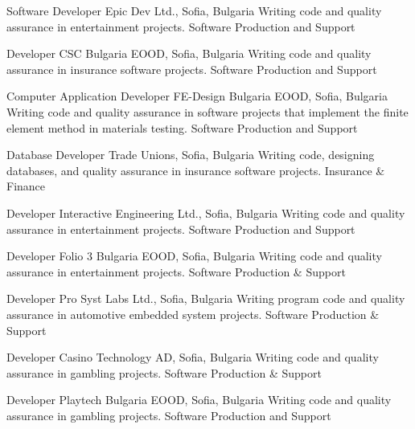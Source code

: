 \documentclass[english,a4paper]{europasscv}
\begin{document}
\begin{europasscv}
   {Software Developer}
  \ecvitem {} {Epic Dev Ltd., Sofia, Bulgaria}
  \ecvitem {} {Writing code and quality assurance in entertainment projects.}
  \ecvitem {} { \quad Software Production and Support}
  
   {Developer}
  \ecvitem {} {CSC Bulgaria EOOD, Sofia, Bulgaria}
  \ecvitem {} {Writing code and quality assurance in insurance software projects.}
  \ecvitem {} { \quad Software Production and Support}
  
   {Computer Application Developer}
  \ecvitem {} {FE-Design Bulgaria EOOD, Sofia, Bulgaria}
  \ecvitem {} {Writing code and quality assurance in software projects that implement the finite element method in materials testing.}
  \ecvitem {} { \quad Software Production and Support}
  
   {Database Developer}
  \ecvitem {} {Trade Unions, Sofia, Bulgaria}
  \ecvitem {} {Writing code, designing databases, and quality assurance in insurance software projects.}
  \ecvitem {} { \quad Insurance \& Finance}
  
   {Developer}
  \ecvitem {} {Interactive Engineering Ltd., Sofia, Bulgaria}
  \ecvitem {} {Writing code and quality assurance in entertainment projects.}
  \ecvitem {} { \quad Software Production and Support}
  
   {Developer}
  \ecvitem {} {Folio 3 Bulgaria EOOD, Sofia, Bulgaria}
  \ecvitem {} {Writing code and quality assurance in entertainment projects.}
  \ecvitem {} { \quad Software Production \& Support}
  
   {Developer}
  \ecvitem {} {Pro Syst Labs Ltd., Sofia, Bulgaria}
  \ecvitem {} {Writing program code and quality assurance in automotive embedded system projects.}
  \ecvitem {} { \quad Software Production \& Support}
  
   {Developer}
  \ecvitem {} {Casino Technology AD, Sofia, Bulgaria}
  \ecvitem {} {Writing code and quality assurance in gambling projects.}
  \ecvitem {} { \quad Software Production \& Support}

   {Developer}
  \ecvitem {} {Playtech Bulgaria EOOD, Sofia, Bulgaria}
  \ecvitem {} {Writing code and quality assurance in gambling projects.}
  \ecvitem {} { \quad Software Production and Support}
  

\end{europasscv}
\end{document}

